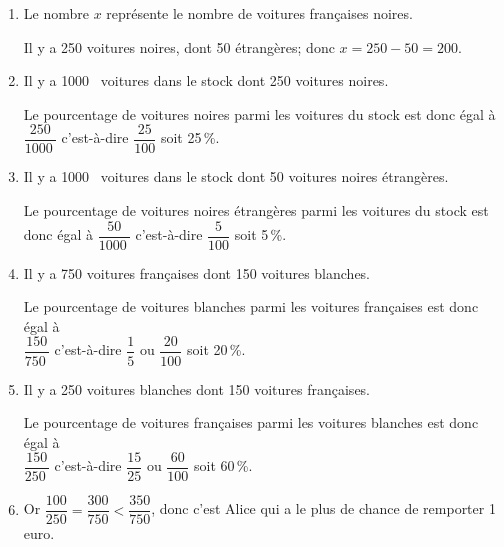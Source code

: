 \documentclass[10pt]{article}
\providecommand{\np}[2][]{{#2~#1}}
\begin{document}
\begin{enumerate}
\item 
Le nombre $x$ représente le nombre de voitures françaises noires.

Il y a 250 voitures noires, dont 50 étrangères; donc $x=250-50=200$.

\item 
Il y a \np{1000} voitures dans le stock dont 250 voitures noires.

Le pourcentage de voitures noires parmi les voitures du stock est donc égal à\\
 $\dfrac{250}{\np{1000}}$ c'est-à-dire $\dfrac{25}{100}$ soit 25\,\%.

\item 
Il y a \np{1000} voitures dans le stock dont 50 voitures noires étrangères.

Le pourcentage de voitures noires étrangères parmi les voitures du stock est donc égal à
 $\dfrac{50}{\np{1000}}$ c'est-à-dire $\dfrac{5}{100}$ soit 5\,\%.

\item 
Il y a 750 voitures françaises dont 150 voitures blanches.

Le pourcentage de voitures blanches parmi les voitures françaises est donc égal à\\
 $\dfrac{150}{\np{750}}$ c'est-à-dire $\dfrac{1}{5}$ ou $\dfrac{20}{100}$ soit 20\,\%.

\item 
Il y a 250 voitures blanches dont 150 voitures françaises.

Le pourcentage de voitures françaises parmi les voitures blanches  est donc égal à\\
 $\dfrac{150}{\np{250}}$ c'est-à-dire $\dfrac{15}{25}$ ou $\dfrac{60}{100}$ soit 60\,\%.

\item 
{}

Or $\dfrac{100}{250} = \dfrac{300}{750} < \dfrac{350}{750}$,
donc c'est Alice qui a le plus de chance de remporter 1 euro.
\end{enumerate}

\bigskip
\end{document}
